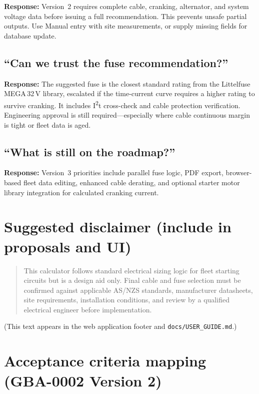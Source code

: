 \documentclass[11pt,a4paper]{report}
\begin{document}
\textbf{Response:} Version~2 requires complete cable, cranking, alternator, and system voltage data before issuing a full recommendation. This prevents unsafe partial outputs. Use Manual entry with site measurements, or supply missing fields for database update.

\subsection{``Can we trust the fuse recommendation?''}

\textbf{Response:} The suggested fuse is the closest standard rating from the Littelfuse MEGA\,32\,V library, escalated if the time-current curve requires a higher rating to survive cranking. It includes I\textsuperscript{2}t cross-check and cable protection verification. Engineering approval is still required---especially where cable continuous margin is tight or fleet data is aged.

\subsection{``What is still on the roadmap?''}

\textbf{Response:} Version~3 priorities include parallel fuse logic, PDF export, browser-based fleet data editing, enhanced cable derating, and optional starter motor library integration for calculated cranking current.

\section{Suggested disclaimer (include in proposals and UI)}

\begin{quote}
\small
This calculator follows standard electrical sizing logic for fleet starting circuits but is a design aid only. Final cable and fuse selection must be confirmed against applicable AS/NZS standards, manufacturer datasheets, site requirements, installation conditions, and review by a qualified electrical engineer before implementation.
\end{quote}

(This text appears in the web application footer and \texttt{docs/USER\_GUIDE.md}.)

\section{Acceptance criteria mapping (GBA-0002 Version 2)}
\end{document}
